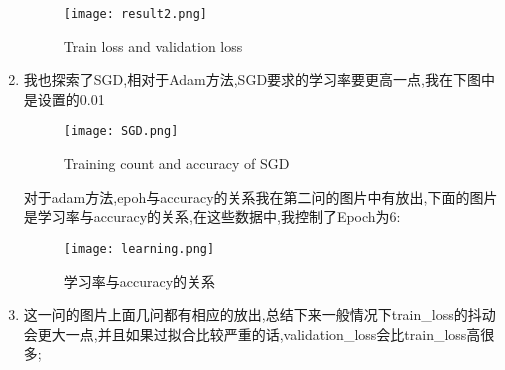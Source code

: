 \documentclass[11pt, a4paper, UTF8]{ctexart}
\begin{document}
\begin{solution}
\begin{enumerate}
\begin{figure}[htbp] 
	\centering
	\texttt{[image: result2.png]}
	\caption{Train loss and validation loss}
\end{figure} 
\newpage

\item 我也探索了SGD,相对于Adam方法,SGD要求的学习率要更高一点,我在下图中是设置的0.01
   	\begin{figure}[htbp] 
	\centering
	\texttt{[image: SGD.png]}
	\caption{Training count and accuracy of SGD}
\end{figure} 
\newpage

对于adam方法,epoh与accuracy的关系我在第二问的图片中有放出,下面的图片是学习率与accuracy的关系,在这些数据中,我控制了Epoch为6:
   	\begin{figure}[htbp] 
	\centering
	\texttt{[image: learning.png]}
	\caption{学习率与accuracy的关系}
\end{figure} 
\item 这一问的图片上面几问都有相应的放出,总结下来一般情况下train\_loss的抖动会更大一点,并且如果过拟合比较严重的话,validation\_loss会比train\_loss高很多;
   \end{enumerate}
\end{solution}







   





	
    
\end{document}

